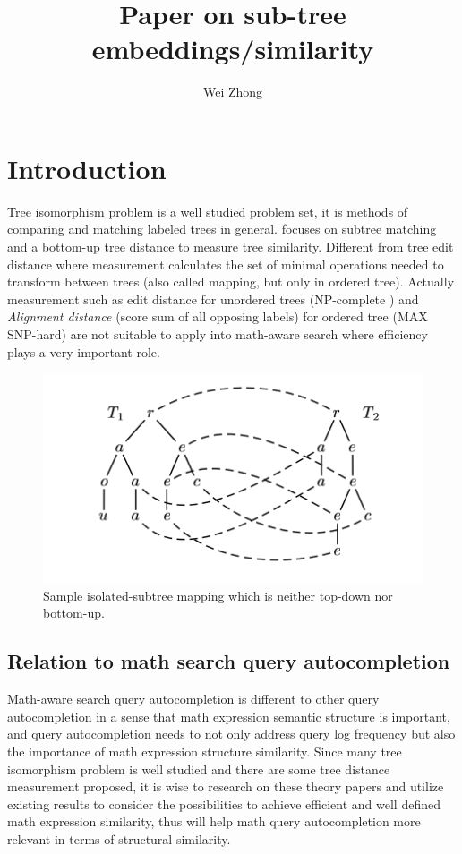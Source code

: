 \documentclass[a4paper]{article}
\title{Paper on sub-tree embeddings/similarity}
\author{Wei Zhong}
\begin{document}
\maketitle

\section{Introduction}

Tree isomorphism problem is a well studied problem set, it is methods of comparing and matching labeled trees in general. \cite{Valiente01anefficient} focuses on subtree matching and a bottom-up tree distance to measure tree similarity. Different from tree edit distance where measurement calculates the set of minimal operations needed to transform between trees (also called mapping, but only in ordered tree). 
Actually measurement such as edit distance for unordered trees (NP-complete \cite{ZHANG1992133}) and \textit{Alignment distance} \cite{JIANG1995137} (score sum of all opposing labels) for ordered tree (MAX SNP-hard) are not suitable to apply into math-aware search where efficiency plays a very important role.

\begin{figure}
\centering
\includegraphics[width=0.5 \textwidth]{a.png}
\caption{\label{aaa} Sample isolated-subtree mapping which is neither top-down nor bottom-up.}
\end{figure}

\subsection{Relation to math search query autocompletion}
Math-aware search query autocompletion is different to other query autocompletion in a sense that math expression semantic structure is important, and query autocompletion needs to not only address query log frequency but also the importance of math expression structure similarity. Since many tree isomorphism problem is well studied and there are some tree distance measurement proposed, it is wise to research on these theory papers and utilize existing results to consider the possibilities to achieve efficient and well defined math expression similarity, thus will help math query autocompletion more relevant in terms of structural similarity.
\end{document}

